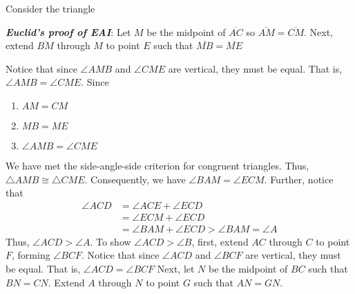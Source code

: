 \documentclass{report}
\begin{document}
\begin{itemize}
\begin{enumerate}
            \end{enumerate}
            \bigbreak \noindent 
            Consider the triangle 
            \bigbreak \noindent 
            \begin{figure}[ht]
                \centering
                \label{fig:tri3}
            \end{figure}
            \bigbreak \noindent 
            \textbf{\textit{Euclid's proof of EAI}}: Let $ M$ be the midpoint of $\overline{AC}$ so $\overline{AM} = \overline{CM}$. Next, extend $\overline{BM}$ through $M$ to point $E$ such that $\overline{MB} = \overline{ME}$
            \bigbreak \noindent 
            \begin{figure}[ht]
                \centering
                \label{fig:tri4}
            \end{figure}
            \bigbreak \noindent 
            Notice that since $\angle AMB$ and $\angle CME$ are vertical, they must be equal. That is, $\angle AMB = \angle CME$. Since 
            \begin{enumerate}
                \item $AM = CM $
                \item $MB = ME$
                \item $\angle AMB = \angle CME $
            \end{enumerate}
            We have met the side-angle-side criterion for congruent triangles. Thus, $\triangle AMB \cong \triangle CME$. Consequently, we have $\angle BAM = \angle ECM $. Further, notice that
            \begin{align*}
                \angle ACD &= \angle ACE + \angle ECD \\
                            &= \angle ECM + \angle ECD \\
                           &= \angle BAM + \angle ECD > \angle BAM = \angle A
            \end{align*}
            Thus, $\angle ACD > \angle A$. To show $\angle ACD > \angle B$, first, extend $AC$ through $C$ to point $F$, forming  $\angle BCF$. Notice that since $\angle ACD$ and $\angle BCF$ are vertical, they must be equal. That is, $\angle ACD = \angle BCF$ 
            \bigbreak \noindent 
            Next, let $N$ be the midpoint of $BC$ such that $BN = CN$. Extend $A$ through $N$ to point $G$ such that $AN=GN$.
            \bigbreak \noindent 
            \begin{figure}[ht]
                \centering

\end{figure}
\end{itemize}
\end{document}

